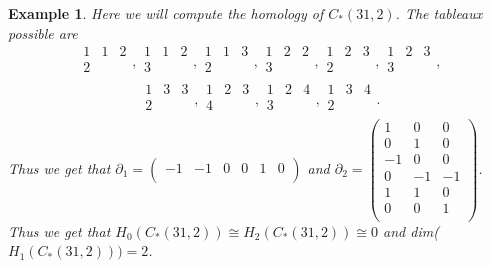 \documentclass{amsart}
\newtheorem{example}[theorem]{Example}
\begin{document}
\begin{example}
  Here we will compute the homology of $C_*(31,2)$.
  The tableaux possible are
         $$\begin{array}{ccc} 1 & 1 & 2 \\ 2&&\\ \end{array}, \begin{array}{ccc} 1 & 1 & 2 \\ 3&&\\ \end{array},
           \begin{array}{ccc} 1 & 1 & 3 \\ 2&&\\ \end{array}, \begin{array}{ccc} 1 & 2 & 2 \\ 3&&\\ \end{array},
           \begin{array}{ccc} 1 & 2 & 3 \\ 2&&\\ \end{array}, \begin{array}{ccc} 1 & 2 & 3 \\ 3&&\\ \end{array},$$
         $$\begin{array}{ccc} 1 & 3 & 3 \\ 2&&\\ \end{array}, \begin{array}{ccc} 1 & 2 & 3 \\ 4&&\\ \end{array},
           \begin{array}{ccc} 1 & 2 & 4 \\ 3&&\\ \end{array}, \begin{array}{ccc} 1 & 3 & 4 \\ 2&&\\ \end{array}.$$
         Thus we get that $\partial_1 = \left( \begin{array}{cccccc}-1 & -1 & 0 & 0 & 1 & 0 \\ 
         \end{array} \right) $ and $\partial_2 = \left(\begin{array}{ccc} 1 & 0 & 0\\ 0 & 1 & 0 \\ -1 & 0 & 0 \\ 0 & -1 & -1\\
         1 & 1 & 0\\ 0 & 0 & 1\\ \end{array} \right) $. Thus we get that $H_0(C_*(31,2)) \cong H_2(C_*(31,2)) \cong 0$ and 
         dim($H_1(C_*(31,2))) = 2$.

\end{example}
\end{document}
